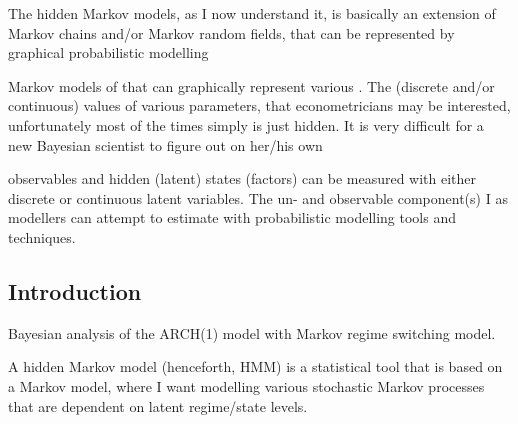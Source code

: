 \documentclass[a4paper,11pt,english]{article}
\begin{document}

	The hidden Markov models, as I now understand it, is basically an extension of Markov chains and/or Markov random fields, that can be represented by 	
	graphical probabilistic modelling 
		
	Markov models of that can graphically represent various . The (discrete and/or continuous) values of various parameters, that econometricians may be 
	interested, unfortunately most of the times simply is just hidden. It is very difficult for a new Bayesian scientist to figure out on her/his own    
	
	observables and 
	hidden (latent) states (factors) can be measured with either discrete or continuous latent variables. The un- and observable component(s) I as
	modellers can attempt to estimate with probabilistic modelling tools and techniques. 
	
	
	
			
		\subsection{Introduction}
		
		Bayesian analysis of the ARCH(1) model with Markov regime switching model.


		A hidden Markov model (henceforth, HMM) is a statistical tool that is based on a Markov model, where I want modelling various stochastic 
		Markov processes that are dependent on latent regime/state levels.
		
\end{document}

